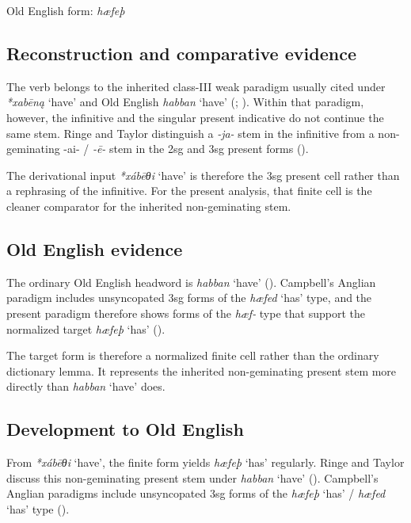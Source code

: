 \documentclass[
  british,
  a4paper,
  openany]{book}
\providecommand{\Recon}[1]{\emph{*#1}}
{\catcode`→=\active \global\def→{\ensuremath{\rightarrow}}}
\providecommand{\Recon}[1]{\emph{*#1}}
{\catcode`→=\active \global\def→{\ensuremath{\rightarrow}}}
\begin{document}
Old English form: \emph{hæfeþ}

\subsection{Reconstruction and comparative
evidence}\label{reconstruction-and-comparative-evidence-115}

The verb belongs to the inherited class-III weak paradigm usually cited
under {\Recon{xabēną} `have'} and Old English {\emph{habban}} `have'
(;
). Within that
paradigm, however, the infinitive and the singular present indicative do
not continue the same stem. Ringe and Taylor distinguish a \emph{-ja-}
stem in the infinitive from a non-geminating -ai- / \emph{-ē-} stem in
the 2sg and 3sg present forms ().

The derivational input {\Recon{xábēθi} `have'} is therefore the 3sg
present cell rather than a rephrasing of the infinitive. For the present
analysis, that finite cell is the cleaner comparator for the inherited
non-geminating stem.

\subsection{Old English evidence}\label{old-english-evidence-115}

The ordinary Old English headword is {\emph{habban}} `have'
(). Campbell's Anglian
paradigm includes unsyncopated 3sg forms of the {\emph{hæfed}} `has'
type, and the present paradigm therefore shows forms of the \emph{hæf-}
type that support the normalized target {\emph{hæfeþ}} `has'
().

The target form is therefore a normalized finite cell rather than the
ordinary dictionary lemma. It represents the inherited non-geminating
present stem more directly than {\emph{habban}} `have' does.

\subsection{Development to Old
English}\label{development-to-old-english-115}

From {\Recon{xábēθi} `have'}, the finite form yields {\emph{hæfeþ}}
`has' regularly. Ringe and Taylor discuss this non-geminating present
stem under {\emph{habban}} `have' (). Campbell's Anglian paradigms include
unsyncopated 3sg forms of the {\emph{hæfeþ}} `has' / {\emph{hæfed}}
`has' type ().
\end{document}
